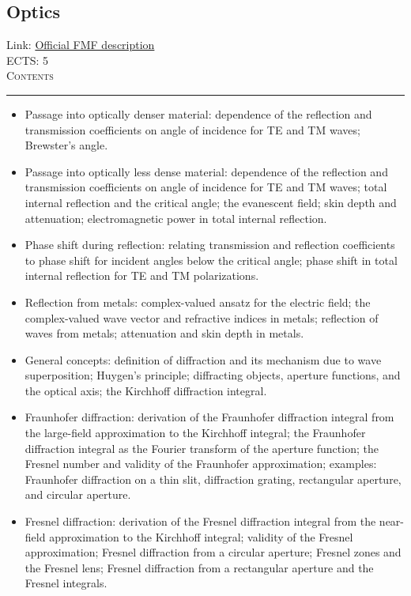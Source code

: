 \documentclass[11pt, a4paper]{article}
\newenvironment{course}[3]{
\subsection{#1}%
Link: \href{#2}{Official FMF description}\\%
ECTS: #3%
\vspace{1ex}
\\
{\large \textsc{Contents}}\\[-0.9ex]%
\rule{\textwidth}{0.5pt}
\vspace{-3ex}
}
{}
\newenvironment{chapter}[1]{
\begin{tcolorbox}[title=#1, breakable]
}
{\end{tcolorbox}}
\begin{document}
\begin{course}{Optics}{https://www.fmf.uni-lj.si/en/study-physics/programmes/1fiz/2020/7000777/courses/1165/}{5}
\begin{chapter}{Reflection and refraction}
\begin{itemize}
            \item Passage into optically denser material: dependence of the reflection and transmission coefficients on angle of incidence for TE and TM waves; Brewster's angle.
            
            \item Passage into optically less dense material: dependence of the reflection and transmission coefficients on angle of incidence for TE and TM waves; total internal reflection and the critical angle; the evanescent field; skin depth and attenuation; electromagnetic power in total internal reflection.

            \item Phase shift during reflection: relating transmission and reflection coefficients to phase shift for incident angles below the critical angle; phase shift in total internal reflection for TE and TM polarizations.

            \item Reflection from metals: complex-valued ansatz for the electric field; the complex-valued wave vector and refractive indices in metals; reflection of waves from metals; attenuation and skin depth in metals.
        
        \end{itemize}
    \end{chapter}

    \begin{chapter}{Diffraction}
        \begin{itemize}
        
            \item General concepts: definition of diffraction and its mechanism due to wave superposition; Huygen's principle; diffracting objects, aperture functions, and the optical axis; the Kirchhoff diffraction integral.

            \item Fraunhofer diffraction: derivation of the Fraunhofer diffraction integral from the large-field approximation to the Kirchhoff integral; the Fraunhofer diffraction integral as the Fourier transform of the aperture function; the Fresnel number and validity of the Fraunhofer approximation; examples: Fraunhofer diffraction on a thin slit, diffraction grating, rectangular aperture, and circular aperture.

            \item Fresnel diffraction: derivation of the Fresnel diffraction integral from the near-field approximation to the Kirchhoff integral; validity of the Fresnel approximation; Fresnel diffraction from a circular aperture; Fresnel zones and the Fresnel lens; Fresnel diffraction from a rectangular aperture and the Fresnel integrals.
        

\end{itemize}
\end{chapter}
\end{course}
\end{document}
